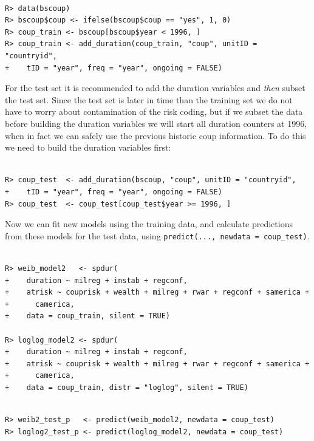 \documentclass[12pt,onesided]{amsart}
\begin{document}
\begin{lstlisting}

R> data(bscoup)
R> bscoup$coup <- ifelse(bscoup$coup == "yes", 1, 0)
R> coup_train <- bscoup[bscoup$year < 1996, ]
R> coup_train <- add_duration(coup_train, "coup", unitID = "countryid", 
+    tID = "year", freq = "year", ongoing = FALSE)

\end{lstlisting}

For the test set it is recommended to add the duration variables and \textit{then} subset the test set. Since the test set is later in time than the training set we do not have to worry about contamination of the risk coding, but if we subset the data before building the duration variables we will start all duration counters at 1996, when in fact we can safely use the previous historic coup information. To do this we need to build the duration variables first:

\begin{lstlisting}

R> coup_test  <- add_duration(bscoup, "coup", unitID = "countryid", 
+    tID = "year", freq = "year", ongoing = FALSE)
R> coup_test  <- coup_test[coup_test$year >= 1996, ]

\end{lstlisting}

Now we can fit new models using the training data, and calculate
predictions from these models for the test data, using
\verb|predict(..., newdata = coup_test)|.

\begin{lstlisting}

R> weib_model2   <- spdur(
+    duration ~ milreg + instab + regconf,
+    atrisk ~ couprisk + wealth + milreg + rwar + regconf + samerica + 
+      camerica,
+    data = coup_train, silent = TRUE)

R> loglog_model2 <- spdur(
+    duration ~ milreg + instab + regconf,
+    atrisk ~ couprisk + wealth + milreg + rwar + regconf + samerica + 
+      camerica,
+    data = coup_train, distr = "loglog", silent = TRUE) 

\end{lstlisting}

\begin{lstlisting}

R> weib2_test_p   <- predict(weib_model2, newdata = coup_test)
R> loglog2_test_p <- predict(loglog_model2, newdata = coup_test)

\end{lstlisting}
\end{document}
